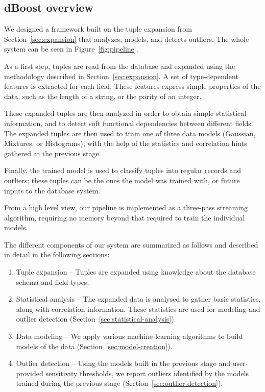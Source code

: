 \subsection{dBoost overview}
\label{sec:overview}

\begin{figure*}
  \centering %
  \caption{The \dBoost/ pipeline}
  \label{fig:pipeline}
\end{figure*}


We designed a framework built on the tuple expansion from Section~\ref{sec:expansion} that analyzes, models, and detects outliers.
The whole system can be seen in Figure~\ref{fig:pipeline}.

As a first step, tuples are read from the database and expanded using the methodology described in Section~\ref{sec:expansion}.
A set of type-dependent features is extracted for each field. 
These features express simple properties of the data, such as the length of a string, or the parity of an integer.

These expanded tuples are then analyzed in order to obtain simple statistical information, and to detect soft functional dependencies between different fields. The expanded tuples are then used to train one of three data models (Gaussian, Mixtures, or Histograms), with the help of the statistics and correlation hints gathered at the previous stage.

Finally, the trained model is used to classify tuples into regular records and outliers; these tuples can be the ones the model was trained with, or future inputs to the database system.

From a high level view, our pipeline is implemented as a three-pass streaming algorithm, requiring no memory beyond that required to train the individual models.

The different components of our system are summarized as follows and described in detail in the following sections:

\begin{enumerate}
\item Tuple expansion -- Tuples are expanded using knowledge about the database schema and field types.
\item Statistical analysis -- The expanded data is analysed to gather basic statistics, along with correlation information. These statistics are used for modeling and outlier detection (Section~\ref{sec:statistical-analysis}).
\item Data modeling -- We apply various machine-learning algorithms to build models of the data (Section~\ref{sec:model-creation}).
\item Outlier detection -- Using the models built in the previous stage and user-provided sensitivity thresholds, we report outliers identified by the models trained during the previous stage (Section~\ref{sec:outlier-detection}).
\end{enumerate}

